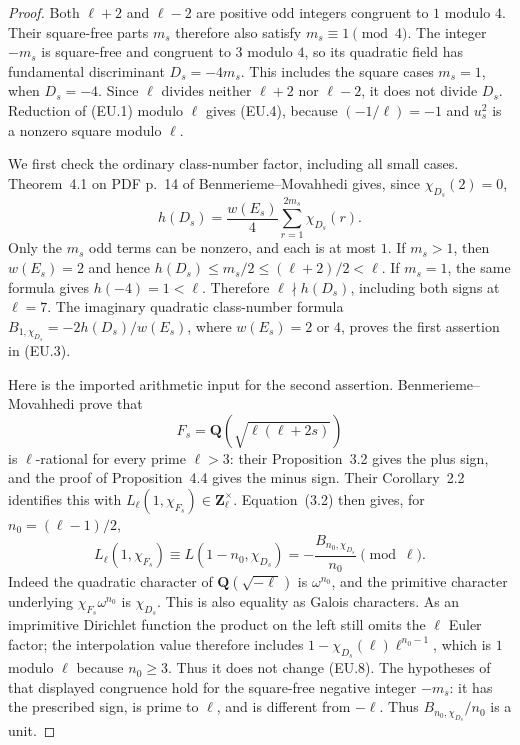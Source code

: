 \begin{proof}
Both $\ell+2$ and $\ell-2$ are positive odd integers congruent to $1$
modulo $4$.  Their square-free parts $m_s$ therefore also satisfy
$m_s\equiv1\pmod4$.  The integer $-m_s$ is square-free and congruent
to $3$ modulo $4$, so its quadratic field has fundamental discriminant
$D_s=-4m_s$.  This includes the square cases $m_s=1$, when $D_s=-4$.
Since $\ell$ divides neither $\ell+2$ nor $\ell-2$, it does not divide
$D_s$.  Reduction of (EU.1) modulo $\ell$ gives (EU.4), because
$(-1/\ell)=-1$ and $u_s^2$ is a nonzero square modulo $\ell$.

We first check the ordinary class-number factor, including all small
cases.  Theorem~4.1 on PDF p.~14 of Benmerieme--Movahhedi gives,
since $\chi_{D_s}(2)=0$,
\[
 h(D_s)=\frac{w(E_s)}4\sum_{r=1}^{2m_s}\chi_{D_s}(r).
                                                               \tag{EU.6}
\]
Only the $m_s$ odd terms can be nonzero, and each is at most $1$.
If $m_s>1$, then $w(E_s)=2$ and hence
$h(D_s)\leq m_s/2\leq(\ell+2)/2<\ell$.
If $m_s=1$, the same formula gives $h(-4)=1<\ell$.
Therefore $\ell\nmid h(D_s)$, including both signs at $\ell=7$.
The imaginary quadratic class-number formula
$B_{1,\chi_{D_s}}=-2h(D_s)/w(E_s)$, where $w(E_s)=2$ or $4$,
proves the first assertion in (EU.3).

Here is the imported arithmetic input for the second assertion.
Benmerieme--Movahhedi prove that
\[
             F_s=\mathbf Q(\sqrt{\ell(\ell+2s)})
                                                               \tag{EU.7}
\]
is $\ell$-rational for every prime $\ell>3$: their Proposition~3.2
gives the plus sign, and the proof of Proposition~4.4 gives the minus
sign.  Their Corollary~2.2 identifies this with
$L_\ell(1,\chi_{F_s})\in\mathbf Z_\ell^\times$.
Equation~(3.2) then gives, for $n_0=(\ell-1)/2$,
\[
 L_\ell(1,\chi_{F_s})
       \equiv L(1-n_0,\chi_{D_s})
       =-\frac{B_{n_0,\chi_{D_s}}}{n_0}\pmod\ell.          \tag{EU.8}
\]
Indeed the quadratic character of $\mathbf Q(\sqrt{-\ell})$
is $\omega^{n_0}$, and the primitive character underlying
$\chi_{F_s}\omega^{n_0}$ is $\chi_{D_s}$.  This is also equality
as Galois characters.  As an imprimitive Dirichlet function the
product on the left still omits the $\ell$ Euler factor; the
interpolation value therefore includes
$1-\chi_{D_s}(\ell)\ell^{n_0-1}$, which is $1$ modulo $\ell$
because $n_0\geq3$.  Thus it does not change (EU.8).
The hypotheses of that
displayed congruence hold for the square-free negative integer $-m_s$:
it has the prescribed sign, is prime to $\ell$, and is different from
$-\ell$.  Thus $B_{n_0,\chi_{D_s}}/n_0$ is a unit.


\end{proof}
